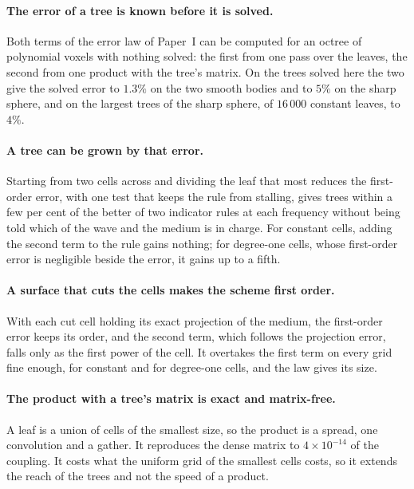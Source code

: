 \documentclass[11pt,a4paper]{article}
\begin{document}
\paragraph{The error of a tree is known before it is solved.} Both terms of the error law of Paper~I
can be computed for an octree of polynomial voxels with nothing solved: the first from one pass over
the leaves, the second from one product with the tree's matrix. On the trees solved here the two give
the solved error to $1.3\%$ on the two smooth bodies and to $5\%$ on the sharp sphere, and on the
largest trees of the sharp sphere, of $16\,000$ constant leaves, to $4\%$.

\paragraph{A tree can be grown by that error.} Starting from two cells across and dividing the leaf
that most reduces the first-order error, with one test that keeps the rule from stalling, gives trees
within a few per cent of the better of two indicator rules at each frequency without being told which
of the wave and the medium is in charge. For constant cells, adding the second term to the rule gains
nothing; for degree-one cells, whose first-order error is negligible beside the error, it gains up to
a fifth.

\paragraph{A surface that cuts the cells makes the scheme first order.} With each cut cell holding its
exact projection of the medium, the first-order error keeps its order, and the second term, which
follows the projection error, falls only as the first power of the cell. It overtakes the first term
on every grid fine enough, for constant and for degree-one cells, and the law gives its size.

\paragraph{The product with a tree's matrix is exact and matrix-free.} A leaf is a union of cells of
the smallest size, so the product is a spread, one convolution and a gather. It reproduces the dense
matrix to $4\times10^{-14}$ of the coupling. It costs what the uniform grid of the smallest cells
costs, so it extends the reach of the trees and not the speed of a product.
\end{document}

